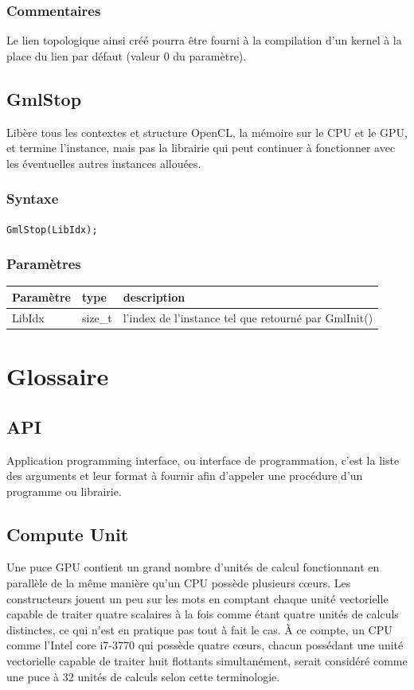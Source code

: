 \documentclass[a4paper,12pt]{article}
\begin{document}
\subsubsection*{Commentaires}
Le lien topologique ainsi créé pourra être fourni à la compilation d'un kernel à la place du lien par défaut (valeur 0 du paramètre).


\subsection{GmlStop}

Libère tous les contextes et structure OpenCL, la mémoire sur le CPU et le GPU, et termine l'instance, mais pas la librairie qui peut continuer à fonctionner avec les éventuelles autres instances allouées.

\subsubsection*{Syntaxe}

{\tt GmlStop(LibIdx);}

\subsubsection*{Paramètres}

\begin{tabular}{|m{2cm}|m{1.5cm}|m{10.5cm}|}
\hline
Paramètre  & type    & description \\
\hline
LibIdx     & size\_t & l'index de l'instance tel que retourné par GmlInit() \\
\hline
\end{tabular}


%
%


\section{Glossaire}

\subsection{API}
Application programming interface, ou interface de programmation, c'est la liste des arguments et leur format à fournir afin d'appeler une procédure d'un programme ou librairie.

\subsection{Compute Unit}
Une puce GPU contient un grand nombre d'unités de calcul fonctionnant en parallèle de la même manière qu'un CPU possède plusieurs c\oe urs. Les constructeurs jouent un peu sur les mots en comptant chaque unité vectorielle capable de traiter quatre scalaires à la fois comme étant quatre unités de calculs distinctes, ce qui n'est en pratique pas tout à fait le cas. À ce compte, un CPU comme l'Intel core i7-3770 qui possède quatre c\oe urs, chacun possédant une unité vectorielle capable de traiter huit flottants simultanément, serait considéré comme une puce à 32 unités de calculs selon cette terminologie.
\end{document}
